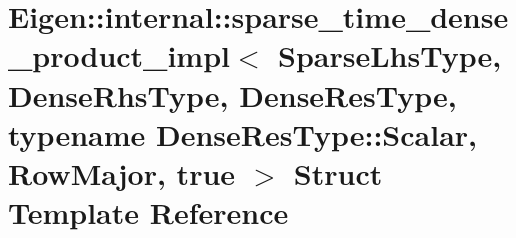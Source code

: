 \hypertarget{struct_eigen_1_1internal_1_1sparse__time__dense__product__impl_3_01_sparse_lhs_type_00_01_dense_b414480199bc806c66dca70961af5e2d}{}\section{Eigen\+::internal\+::sparse\+\_\+time\+\_\+dense\+\_\+product\+\_\+impl$<$ Sparse\+Lhs\+Type, Dense\+Rhs\+Type, Dense\+Res\+Type, typename Dense\+Res\+Type\+::Scalar, Row\+Major, true $>$ Struct Template Reference}
\label{struct_eigen_1_1internal_1_1sparse__time__dense__product__impl_3_01_sparse_lhs_type_00_01_dense_b414480199bc806c66dca70961af5e2d}
